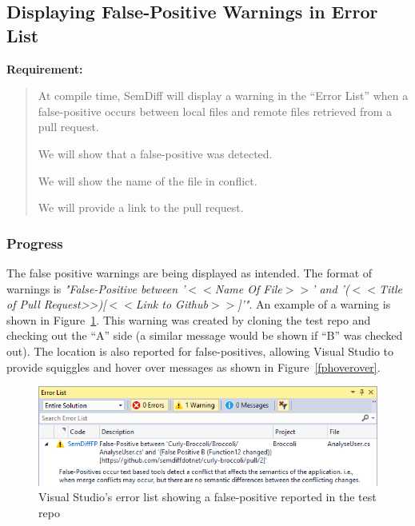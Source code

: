 \documentclass[draftclsnofoot,onecolumn]{IEEEtran}
\begin{document}
\subsection{Displaying False-Positive Warnings in Error List}%

\textbf{Requirement:}

\begin{quote}

At compile time, SemDiff will display a warning in the “Error List” when a 
false-positive occurs between local files and remote files retrieved from a 
pull request.

We will show that a false-positive was detected.

We will show the name of the file in conflict.

We will provide a link to the pull request.

\end{quote}

\subsubsection{Progress}
The false positive warnings are being displayed as intended. The format of 
warnings is \textit{"False-Positive between '$<<$Name Of File$>>$' and 
    '($<<$Title of Pull Request>>)[$<<$Link to Github$>>$]'"}. An example of 
a warning is shown in Figure~\ref{fperrorlist}. This warning was created by 
cloning the test repo and checking out the “A” side (a similar message would 
be shown if “B” was checked out). The location is also reported for 
false-positives, allowing Visual Studio to provide squiggles and hover over 
messages as shown in Figure~\ref{fphoverover}.

\begin{figure}[!htb]
\centering
\includegraphics[scale=1]{FalsePositiveErrorList}
\caption{Visual Studio’s error list showing a false-positive reported in the 
test repo}
\label{fperrorlist}
\end{figure}
\end{document}

